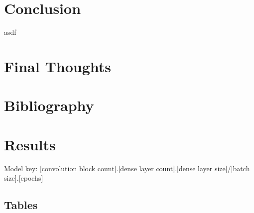 \documentclass[12pt]{article}
\begin{document}
\section{Conclusion}

asdf


\section{Final Thoughts}




\pagebreak
\section{Bibliography}


\pagebreak

\appendix


\section{Results}


Model key: [convolution block count].[dense layer count].[dense layer size]/[batch size].[epochs]


\subsection{Tables}
\end{document}

